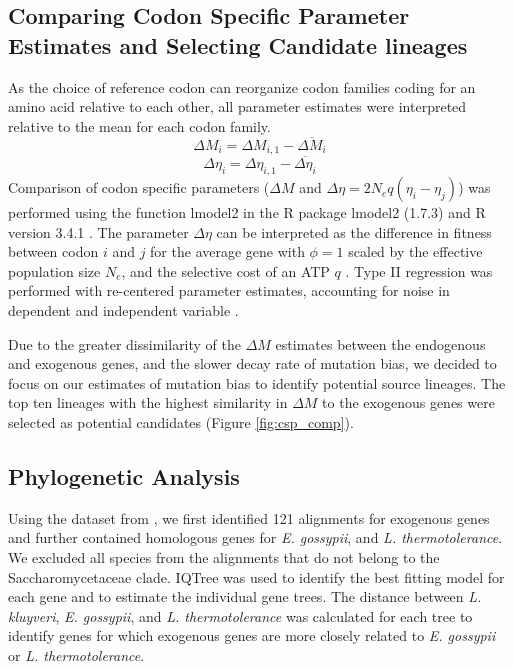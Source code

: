 \documentclass{bmcart}
\newcommand{\kluyveri}{\textit{L. kluyveri}\xspace}
\newcommand{\gossypii}{\textit{E. gossypii}\xspace}
\newcommand{\DM}{\ensuremath{{\Delta M}}\xspace}
\newcommand{\DE}{\ensuremath{{\Delta \eta}}\xspace}
\newcommand{\Ne}{\ensuremath{N_e}\xspace}
\begin{document}
\subsection*{Comparing Codon Specific Parameter Estimates and Selecting Candidate lineages}
As the choice of reference codon can reorganize codon families coding for an amino acid relative to each other, all parameter estimates were interpreted relative to the mean for each codon family.
\begin{equation}
\DM_i = \DM_{i,1} - \overline{\DM_i}
\end{equation}
\begin{equation}
\DE_i = \DE_{i,1} - \overline{\DE_i}
\end{equation}
Comparison of codon specific parameters (\DM and $\DE = 2\Ne q(\eta_i-\eta_j)$) was performed using the function lmodel2 in the R package lmodel2 (1.7.3) \citep{lmodel2} and R version 3.4.1 \citep{rcore}.
The parameter \DE can be interpreted as the difference in fitness between codon $i$ and $j$ for the average gene with $\phi = 1$ scaled by the  effective population size $\Ne$, and the selective cost of an ATP $q$ \citep{gilchrist2007, gilchrist2015}.
Type II regression was performed with re-centered parameter estimates, accounting for noise in dependent and independent variable \citep{SokalAndRohlf1981}.

Due to the greater dissimilarity of the \DM estimates between the endogenous and exogenous genes, and the slower decay rate of mutation bias, we decided to focus on our estimates of mutation bias to identify potential source lineages.
The top ten lineages with the highest similarity in \DM to the exogenous genes were selected as potential candidates (Figure \ref{fig:csp_comp}).

\subsection*{Phylogenetic Analysis}
Using the dataset from \cite{shen2018}, we first identified 121 alignments for exogenous genes and further contained homologous genes for \gossypii, and \textit{L. thermotolerance}.
We excluded all species from the alignments that do not belong to the Saccharomycetaceae clade. 
IQTree \citep{nguyen2015} was used to identify the best fitting model for each gene and to estimate the individual gene trees.
The distance between \kluyveri, \gossypii, and \textit{L. thermotolerance} was calculated for each tree to identify genes for which exogenous genes are more closely related to \gossypii or  \textit{L. thermotolerance}.
\end{document}
